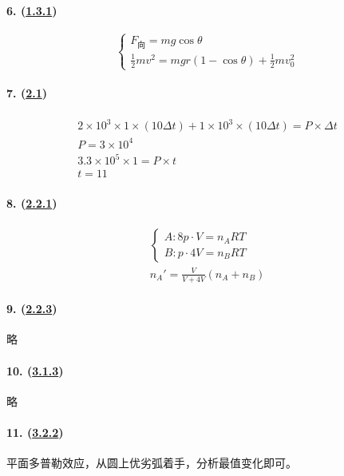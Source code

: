 \paragraph{6. (\hyperref[subsec:1.3.1]{1.3.1})}

\begin{equation*}
    \begin{cases}
        F_\textrm{向}=mg\cos\theta\\
        \frac12mv^2=mgr(1-\cos\theta)+\frac12mv_0^2
    \end{cases}
\end{equation*}

\paragraph{7. (\hyperref[sec:2.1]{2.1})}

\begin{gather*}
    2\times10^3\times1\times(10\Delta t)+1\times10^3\times(10\Delta t)=P\times\Delta t\\
    P=3\times10^4\\
    3.3\times10^5\times1=P\times t\\
    t=11
\end{gather*}

\paragraph{8. (\hyperref[subsec:2.2.1]{2.2.1})}

\begin{gather*}
    \begin{cases}
        A: 8p\cdot V=n_ART\\
        B: p\cdot 4V=n_BRT
    \end{cases}\\
    n_A'=\frac{V}{V+4V}(n_A+n_B)
\end{gather*}

\paragraph{9. (\hyperref[subsec:2.2.3]{2.2.3})} 略
\paragraph{10. (\hyperref[subsec:3.1.3]{3.1.3})} 略
\paragraph{11. (\hyperref[subsec:3.2.2]{3.2.2})} 平面多普勒效应，从圆上优劣弧着手，分析最值变化即可。
